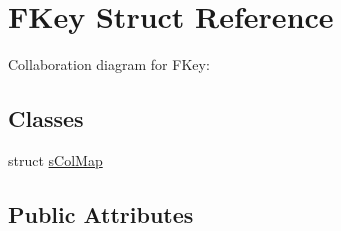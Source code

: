 \hypertarget{structFKey}{}\section{F\+Key Struct Reference}
\label{structFKey}


Collaboration diagram for F\+Key\+:
\subsection*{Classes}
\begin{DoxyCompactItemize}
\item 
struct \hyperlink{structFKey_1_1sColMap}{s\+Col\+Map}
\end{DoxyCompactItemize}
\subsection*{Public Attributes}
